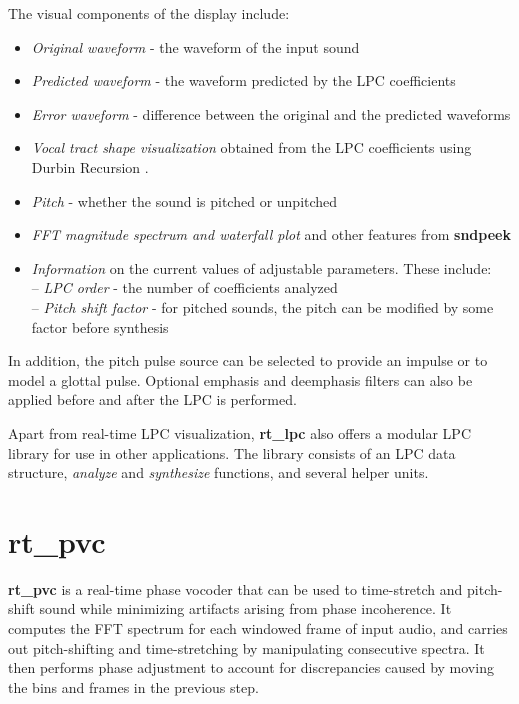 \documentclass{article}
\begin{document}
The visual components of the display include: 
\begin{itemize}
\setlength{\itemsep}{-2pt}
\item \textit{Original waveform} - the waveform of the input sound
\item \textit{Predicted waveform} - the waveform predicted by the LPC coefficients
\item \textit{Error waveform} - difference between the original and the predicted waveforms
\item \textit{Vocal tract shape visualization} obtained from the LPC coefficients using Durbin Recursion \cite{Durbin:60}. 
\item \textit{Pitch} - whether the sound is pitched or unpitched
\item \textit{FFT magnitude spectrum and waterfall plot} and other features from {\bf sndpeek}
\item \textit{Information} on the current values of adjustable parameters. These include:\\
	-- {\it LPC order} - the number of coefficients analyzed\\
	-- {\it Pitch shift factor} - for pitched sounds, the pitch can be modified by some factor before synthesis 
\end{itemize}

In addition, the pitch pulse source can be selected to provide an impulse or to model a glottal pulse. Optional emphasis and deemphasis filters can also be applied before and after the LPC is performed. 

Apart from real-time LPC visualization, {\bf rt\_lpc} also offers a modular LPC library for use in other applications. The library consists of an LPC data structure, \textit{analyze} and \textit{synthesize} functions, and several helper units. 

%
%

\section{rt\_pvc}

{\bf rt\_pvc} is a real-time phase vocoder \cite{Dolson:86, Moorer:78} that can be used to time-stretch and pitch-shift sound while minimizing artifacts arising from phase incoherence. It computes the FFT spectrum for each windowed frame of input audio, and carries out pitch-shifting and time-stretching by manipulating consecutive spectra. It then performs phase adjustment to account for discrepancies caused by moving the bins and frames in the previous step. 
\end{document}
